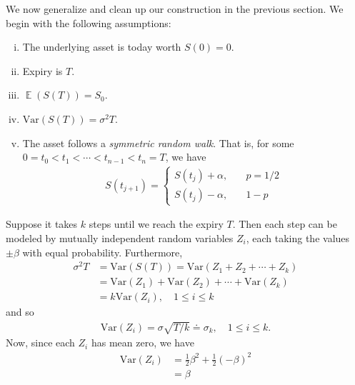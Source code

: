 \documentclass[12pt]{amsbook}
\DeclareMathOperator{\ex}{\mathbb{E}}
\newcommand{\var}{\mathrm{Var}}
\theoremstyle{plain}
\theoremstyle{definition}
\theoremstyle{remark}
\numberwithin{equation}{section}  %
\begin{document}
We now generalize and clean up our construction in the previous section.
We begin with the following assumptions: 
\begin{enumerate}[(i)]
	\item The underlying asset is today worth $S(0) = 0$.
	\item Expiry is $T$.
	\item $\ex(S(T)) = S_{0}$.
	\item $\var(S(T)) = \sigma^{2} T$.
	\item The asset follows a \emph{symmetric random walk}. That is,
		for some \\ $0=t_{0} < t_{1} < \cdots < t_{n-1} < t_{n} = T$, we have
		\begin{equation*}
			\begin{split}
				S(t_{j+1})  = \begin{cases}
					S(t_{j}) + \alpha, \quad & p = 1/2 \\
					S(t_{j}) - \alpha, \quad & 1-p
				\end{cases}
			\end{split}
		\end{equation*}
\end{enumerate}
Suppose it takes $k$ steps until we reach the expiry $T$. Then
each step can be modeled by mutually independent random variables
$Z_{i}$, each taking the values $\pm \beta$ with equal probability.
Furthermore, 
\begin{equation*}
	\begin{split}
		\sigma^{2} T
		& = \var(S(T)) = \var(Z_{1} + Z_{2} + \cdots + Z_{k})
		\\
		& = \var(Z_{1}) + \var(Z_{2}) + \cdots + \var(Z_{k})
		\\
		& = k \var(Z_{i}), \quad 1 \le i \le k
	\end{split}
\end{equation*}
and so
\begin{equation*}
	\begin{split}
		\var(Z_{i}) = \sigma \sqrt{T/k} \doteq \sigma_{k}, \quad 1 \le i \le k.
	\end{split}
\end{equation*}
Now, since each $Z_{i}$ has mean zero, we have
\begin{equation*}
	\begin{split}
		\var(Z_{i}) & = \frac{1}{2}\beta^{2} + \frac{1}{2}{(-\beta)}^{2}
		\\
		& = \beta
	\end{split}
\end{equation*}
\end{document}
